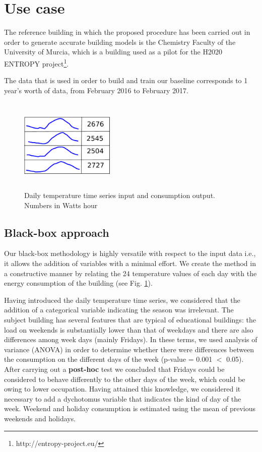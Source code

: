 \documentclass[10pt, conference, compsocconf]{IEEEtran}
\begin{document}
\section{Use case}

The reference building in which the proposed procedure has been carried out in order to generate accurate building models is the Chemistry Faculty of the University of Murcia, which is a building used as a pilot for the H2020 ENTROPY project\footnote{http://entropy-project.eu/}.  

The data that is used in order to build and train our baseline corresponds to 1 year's worth of data, from February 2016 to February 2017. 

\begin{figure}[h]%
\centering
\centerline{\includegraphics[width=4.5cm,height=4.5cm,keepaspectratio]{./pics/table_inputs_outputs.pdf}}
\caption{Daily temperature time series input and consumption output. Numbers in Watts hour}\vspace*{-6pt}
  \label{fig:inout}
\end{figure}

\subsection{Black-box approach}

Our black-box methodology is highly versatile with respect to the input data i.e.,  it allows the addition of variables with a minimal effort. We create the method in a constructive manner by relating the 24 temperature values of each day with the energy consumption of the building (see Fig. \ref{fig:inout}).

Having introduced the daily temperature time series, we considered that the addition of a categorical variable indicating the season was irrelevant. The subject building has several features that are typical of educational buildings: the load %
on weekends is substantially lower than that of weekdays and there are also differences among week days (mainly Fridays).
In these terms, we used analysis of variance (ANOVA) in order to determine whether there were differences between the consumption on the different days of the week (p-value = 0.001 $<$ 0.05). After carrying out a \textbf{post-hoc}  test we concluded that Fridays could be considered to behave differently to the other days of the week, which could be owing to lower occupation. Having attained this knowledge, we considered it necessary to add a dychotomus variable that indicates the kind of day of the week. Weekend and holiday consumption is estimated using the mean of previous weekends and holidays.
\end{document}
